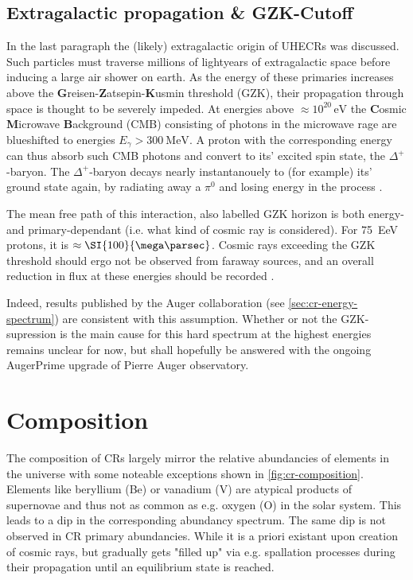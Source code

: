 \subsection{Extragalactic propagation \& GZK-Cutoff}
\label{ssec:gzk-cutoff}

In the last paragraph the (likely) extragalactic origin of UHECRs was discussed. Such particles must traverse millions of lightyears of extragalactic space before
inducing a large air shower on earth. As the energy of these primaries increases above the \textbf{G}reisen-\textbf{Z}atsepin-\textbf{K}usmin threshold (GZK),
their propagation through space is thought to be severely impeded. At energies above $\approx10^{20}\,\text{eV}$ the \textbf{C}osmic \textbf{M}icrowave
\textbf{B}ackground (CMB) consisting of photons in the microwave rage are blueshifted to energies $E_\gamma > \SI{300}{\mega\electronvolt}$. A proton with the 
corresponding energy can thus absorb such CMB photons and convert to its' excited spin state, the $\Delta^+$-baryon. The $\Delta^+$-baryon decays nearly 
instantanouely to (for example) its' ground state again, by radiating away a $\pi^0$ \cite{PDG} and losing energy in the process \cite{PDG}. 

The mean free path of this interaction, also labelled GZK horizon is both energy- and primary-dependant (i.e. what kind of cosmic ray is considered). For 
\SI{75}{\exa\electronvolt} protons, it is $\approx \SI{100}{\mega\parsec}$. Cosmic rays exceeding the GZK threshold should ergo not be observed from faraway 
sources, and an overall reduction in flux at these energies should be recorded \cite{greisen1966end, zatsepin1966j}.

Indeed, results published by the Auger collaboration (see \autoref{sec:cr-energy-spectrum}) are consistent with this assumption. Whether or not the GZK-supression
is the main cause for this hard spectrum at the highest energies remains unclear for now, but shall hopefully be answered with the ongoing AugerPrime upgrade of 
Pierre Auger observatory. 

\section{Composition}
\label{sec:cr-composition}

The composition of CRs largely mirror the relative abundancies of elements in the universe with some noteable exceptions shown in \autoref{fig:cr-composition}.
Elements like beryllium (Be) or vanadium (V) are atypical products of supernovae and thus not as common as e.g. oxygen (O) \cite{gamezo2005three, cowan2004r} in
the solar system. This leads to a dip in the corresponding abundancy spectrum. The same dip is not observed in CR primary abundancies. While it is a priori 
existant upon creation of cosmic rays, but gradually gets "filled up" via e.g. spallation processes during their propagation until an equilibrium state is reached.

